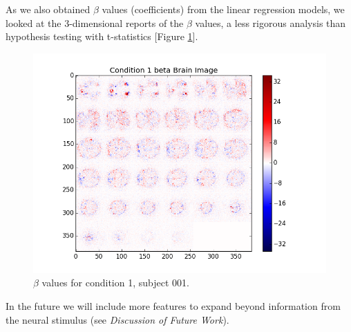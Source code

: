As we also obtained $\beta$ values (coefficients) from the linear regression models, we looked at the 3-dimensional reports of the $\beta$ values, a less rigorous analysis than hypothesis testing with t-statistics [Figure \ref{fig:con1_beta_brain}]. 

\begin{figure}[ht]
\centering
\includegraphics[scale=.5]{images/mr_cond1_beta_brain}    
\caption{$\beta$ values for condition 1, subject 001.}
\label{fig:con1_beta_brain}
\end{figure}

In the future we will include more features to expand beyond information from the neural stimulus (see \textit{Discussion of Future Work}).
